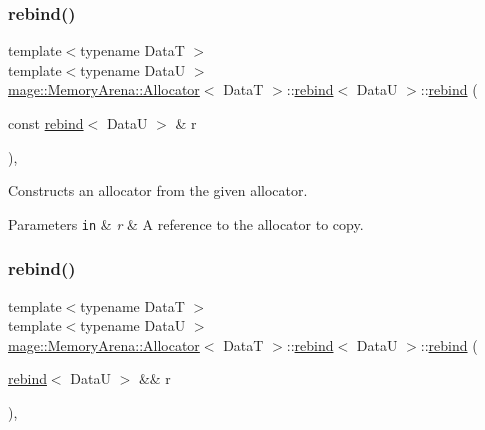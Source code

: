 \subsubsection{\texorpdfstring{rebind()}{rebind()}\hspace{0.1cm}{\footnotesize\ttfamily [2/3]}}
{\footnotesize\ttfamily template$<$typename DataT $>$ \\
template$<$typename DataU $>$ \\
\hyperlink{structmage_1_1_memory_arena_1_1_allocator}{mage\+::\+Memory\+Arena\+::\+Allocator}$<$ DataT $>$\+::\hyperlink{structmage_1_1_memory_arena_1_1_allocator_1_1rebind}{rebind}$<$ DataU $>$\+::\hyperlink{structmage_1_1_memory_arena_1_1_allocator_1_1rebind}{rebind} (\begin{DoxyParamCaption}\item[{const \hyperlink{structmage_1_1_memory_arena_1_1_allocator_1_1rebind}{rebind}$<$ DataU $>$ \&}]{r }\end{DoxyParamCaption})\hspace{0.3cm}{\ttfamily [private]}, {\ttfamily [delete]}}

Constructs an allocator from the given allocator.


\begin{DoxyParams}[1]{Parameters}
\mbox{\tt in}  & {\em r} & A reference to the allocator to copy. \\
\hline
\end{DoxyParams}
\hypertarget{structmage_1_1_memory_arena_1_1_allocator_1_1rebind_a4a59d9007e95c25e40df8771ea926619}{}\label{structmage_1_1_memory_arena_1_1_allocator_1_1rebind_a4a59d9007e95c25e40df8771ea926619} 
\subsubsection{\texorpdfstring{rebind()}{rebind()}\hspace{0.1cm}{\footnotesize\ttfamily [3/3]}}
{\footnotesize\ttfamily template$<$typename DataT $>$ \\
template$<$typename DataU $>$ \\
\hyperlink{structmage_1_1_memory_arena_1_1_allocator}{mage\+::\+Memory\+Arena\+::\+Allocator}$<$ DataT $>$\+::\hyperlink{structmage_1_1_memory_arena_1_1_allocator_1_1rebind}{rebind}$<$ DataU $>$\+::\hyperlink{structmage_1_1_memory_arena_1_1_allocator_1_1rebind}{rebind} (\begin{DoxyParamCaption}\item[{\hyperlink{structmage_1_1_memory_arena_1_1_allocator_1_1rebind}{rebind}$<$ DataU $>$ \&\&}]{r }\end{DoxyParamCaption})\hspace{0.3cm}{\ttfamily [private]}, {\ttfamily [delete]}}

